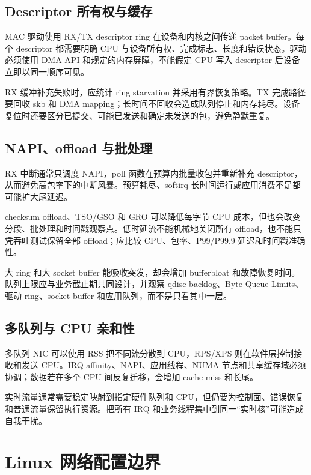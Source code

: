 \subsection{Descriptor 所有权与缓存}

MAC 驱动使用 RX/TX descriptor ring 在设备和内核之间传递 packet buffer。每个 descriptor 都需要明确 CPU 与设备所有权、完成标志、长度和错误状态。驱动必须使用 DMA API 和规定的内存屏障，不能假定 CPU 写入 descriptor 后设备立即以同一顺序可见。

RX 缓冲补充失败时，应统计 ring starvation 并采用有界恢复策略。TX 完成路径要回收 skb 和 DMA mapping；长时间不回收会造成队列停止和内存耗尽。设备复位时还要区分已提交、可能已发送和确定未发送的包，避免静默重复。

\subsection{NAPI、offload 与批处理}

RX 中断通常只调度 NAPI，poll 函数在预算内批量收包并重新补充 descriptor，从而避免高包率下的中断风暴。预算耗尽、softirq 长时间运行或应用消费不足都可能扩大尾延迟。

checksum offload、TSO/GSO 和 GRO 可以降低每字节 CPU 成本，但也会改变分段、批处理和时间戳观察点。低时延流不能机械地关闭所有 offload，也不能只凭吞吐测试保留全部 offload；应比较 CPU、包率、P99/P99.9 延迟和时间戳准确性。

大 ring 和大 socket buffer 能吸收突发，却会增加 bufferbloat 和故障恢复时间。队列上限应与业务截止期共同设计，并观察 qdisc backlog、Byte Queue Limits、驱动 ring、socket buffer 和应用队列，而不是只看其中一层。

\subsection{多队列与 CPU 亲和性}

多队列 NIC 可以使用 RSS 把不同流分散到 CPU，RPS/XPS 则在软件层控制接收和发送 CPU。IRQ affinity、NAPI、应用线程、NUMA 节点和共享缓存域必须协调；数据若在多个 CPU 间反复迁移，会增加 cache miss 和长尾。

实时流量通常需要稳定映射到指定硬件队列和 CPU，但仍要为控制面、错误恢复和普通流量保留执行资源。把所有 IRQ 和业务线程集中到同一“实时核”可能造成自我干扰。

\section{Linux 网络配置边界}

